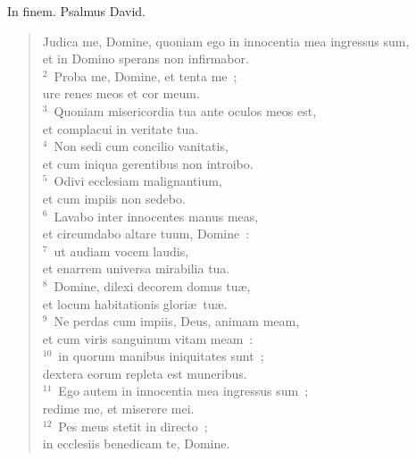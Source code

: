 \bchapter
\lettrine[lines=3,image=true,loversize=0.05,lraise=-0.03]{I}{}n finem. Psalmus David. \begin{flushleft}\begin{verse}\vspace{6pt}Judica me, Domine, quoniam ego in innocentia mea ingressus sum,\\ et in Domino sperans non infirmabor.\\
${}^{2}$~Proba me, Domine, et tenta me~;\\ ure renes meos et cor meum.\\
${}^{3}$~Quoniam misericordia tua ante oculos meos est,\\ et complacui in veritate tua.\\
${}^{4}$~Non sedi cum concilio vanitatis,\\ et cum iniqua gerentibus non introibo.\\
${}^{5}$~Odivi ecclesiam malignantium,\\ et cum impiis non sedebo.\\
${}^{6}$~Lavabo inter innocentes manus meas,\\ et circumdabo altare tuum, Domine~:\\
${}^{7}$~ut audiam vocem laudis,\\ et enarrem universa mirabilia tua.\\
${}^{8}$~Domine, dilexi decorem domus tu\ae ,\\ et locum habitationis glori\ae\ tu\ae .\\
${}^{9}$~Ne perdas cum impiis, Deus, animam meam,\\ et cum viris sanguinum vitam meam~:\\
${}^{10}$~in quorum manibus iniquitates sunt~;\\ dextera eorum repleta est muneribus.\\
${}^{11}$~Ego autem in innocentia mea ingressus sum~;\\ redime me, et miserere mei.\\
${}^{12}$~Pes meus stetit in directo~;\\ in ecclesiis benedicam te, Domine.\end{verse}\end{flushleft}



